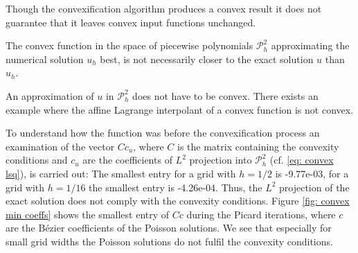 Though the convexification algorithm produces a convex result it does not guarantee that it leaves convex input functions unchanged.

The convex function in the space of piecewise polynomials $\mathcal P^2_h$ approximating the numerical solution $u_h$ best, is not necessarily closer to the exact solution $u$ than $u_h$. %

An approximation of $u$ in $\mathcal P^2_h$ does not have to be convex. There exists an example where the affine Lagrange interpolant of a convex function is not convex\cite[p.3142]{AM2009}. 

To understand how  the function was before the convexification process an examination of the vector $Cc_u$, where $C$ is the matrix containing the convexity conditions and $c_u$ are the coefficients of $L^2$ projection into $\mathcal P^2_h$ (cf. \eqref{eq: convex lsq}), is carried out: The smallest entry for a grid with $h=1/2$ is -9.77e-03, for a grid with $h=1/16$ the smallest entry is -4.26e-04. Thus, the $L^2$ projection of the exact solution does not comply with the convexity conditions.
Figure \ref{fig: convex min coeffs} shows the smallest entry of $Cc$ during the Picard iterations, where $c$ are the B\'ezier coefficients of the Poisson solutions. We see that especially for small grid widths the Poisson solutions do not fulfil the convexity conditions. 

